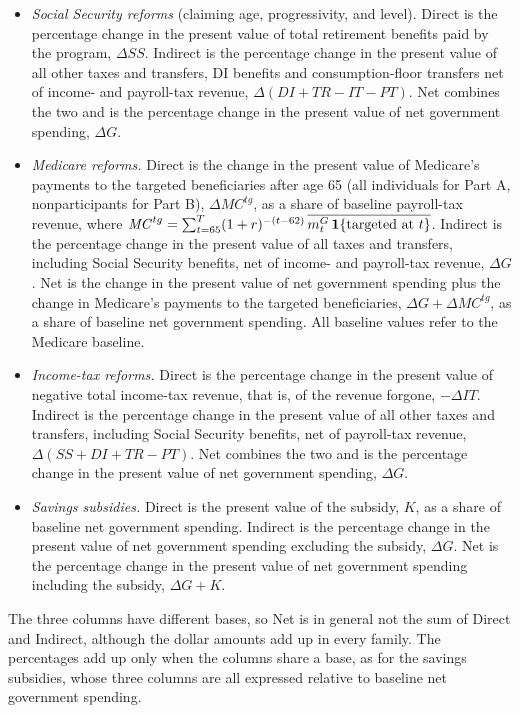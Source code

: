 \begin{itemize}
\item \textit{Social Security reforms} (claiming age, progressivity, and level). Direct is the percentage change in the present value of total retirement benefits paid by the program, $\Delta\mathit{SS}$. Indirect is the percentage change in the present value of all other taxes and transfers, DI benefits and consumption-floor transfers net of income- and payroll-tax revenue, $\Delta(\mathit{DI}+\mathit{TR}-\mathit{IT}-\mathit{PT})$. Net combines the two and is the percentage change in the present value of net government spending, $\Delta G$.
\item \textit{Medicare reforms.} Direct is the change in the present value of Medicare's payments to the targeted beneficiaries after age 65 (all individuals for Part A, nonparticipants for Part B), $\Delta\mathit{MC}^{tg}$, as a share of baseline payroll-tax revenue, where $\mathit{MC}^{tg}=\sum_{t=65}^{T}(1+r)^{-(t-62)}\,\overline{m^{G}_t\,\mathbf{1}\{\text{targeted at } t\}}$. Indirect is the percentage change in the present value of all taxes and transfers, including Social Security benefits, net of income- and payroll-tax revenue, $\Delta G$. Net is the change in the present value of net government spending plus the change in Medicare's payments to the targeted beneficiaries, $\Delta G+\Delta\mathit{MC}^{tg}$, as a share of baseline net government spending. All baseline values refer to the Medicare baseline.
\item \textit{Income-tax reforms.} Direct is the percentage change in the present value of negative total income-tax revenue, that is, of the revenue forgone, $-\Delta\mathit{IT}$. Indirect is the percentage change in the present value of all other taxes and transfers, including Social Security benefits, net of payroll-tax revenue, $\Delta(\mathit{SS}+\mathit{DI}+\mathit{TR}-\mathit{PT})$. Net combines the two and is the percentage change in the present value of net government spending, $\Delta G$.
\item \textit{Savings subsidies.} Direct is the present value of the subsidy, $K$, as a share of baseline net government spending. Indirect is the percentage change in the present value of net government spending excluding the subsidy, $\Delta G$. Net is the percentage change in the present value of net government spending including the subsidy, $\Delta G+K$.
\end{itemize}
The three columns have different bases, so Net is in general not the sum of Direct and Indirect, although the dollar amounts add up in every family. The percentages add up only when the columns share a base, as for the savings subsidies, whose three columns are all expressed relative to baseline net government spending.


